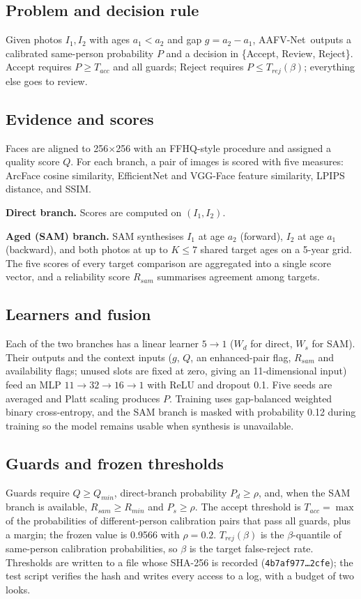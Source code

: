 \documentclass[10pt, a4paper, twocolumn]{article}
\newcommand{\sys}{AAFV-Net}
\begin{document}
\subsection{Problem and decision rule}
Given photos $I_1,I_2$ with ages $a_1<a_2$ and gap $g=a_2-a_1$, \sys\ outputs a calibrated same-person probability $P$ and a decision in \{Accept, Review, Reject\}. Accept requires $P\ge T_{acc}$ and all guards; Reject requires $P\le T_{rej}(\beta)$; everything else goes to review.

\subsection{Evidence and scores}
Faces are aligned to 256$\times$256 with an FFHQ-style procedure and assigned a quality score $Q$. For each branch, a pair of images is scored with five measures: ArcFace cosine similarity, EfficientNet and VGG-Face feature similarity, LPIPS distance, and SSIM.

\textbf{Direct branch.} Scores are computed on $(I_1,I_2)$.

\textbf{Aged (SAM) branch.} SAM synthesises $I_1$ at age $a_2$ (forward), $I_2$ at age $a_1$ (backward), and both photos at up to $K\le7$ shared target ages on a 5-year grid. The five scores of every target comparison are aggregated into a single score vector, and a reliability score $R_{sam}$ summarises agreement among targets.

\subsection{Learners and fusion}
Each of the two branches has a linear learner $5\to1$ ($W_d$ for direct, $W_s$ for SAM). Their outputs and the context inputs ($g$, $Q$, an enhanced-pair flag, $R_{sam}$ and availability flags; unused slots are fixed at zero, giving an 11-dimensional input) feed an MLP $11\to32\to16\to1$ with ReLU and dropout 0.1. Five seeds are averaged and Platt scaling produces $P$. Training uses gap-balanced weighted binary cross-entropy, and the SAM branch is masked with probability 0.12 during training so the model remains usable when synthesis is unavailable.

\subsection{Guards and frozen thresholds}
Guards require $Q\ge Q_{min}$, direct-branch probability $P_d\ge\rho$, and, when the SAM branch is available, $R_{sam}\ge R_{min}$ and $P_s\ge\rho$. The accept threshold is $T_{acc}=\max$ of the probabilities of different-person calibration pairs that pass all guards, plus a margin; the frozen value is 0.9566 with $\rho=0.2$. $T_{rej}(\beta)$ is the $\beta$-quantile of same-person calibration probabilities, so $\beta$ is the target false-reject rate. Thresholds are written to a file whose SHA-256 is recorded (\texttt{4b7af977\ldots2cfe}); the test script verifies the hash and writes every access to a log, with a budget of two looks.
\end{document}
